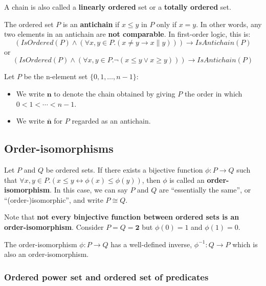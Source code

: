 \documentclass[12pt, letterpaper, oneside]{book}
\begin{document}
A chain is also called a \textbf{linearly ordered} set or a \textbf{totally ordered} set.

The ordered set $P$ is an \textbf{antichain} if $x \leqslant y$ in $P$ only if $x = y$. In other words, any two elements
in an antichain are \textbf{not comparable}. In first-order logic, this is:
\[ (IsOrdered(P) \land (\forall x, y \in P. (x \ne y \rightarrow x \parallel y))) \rightarrow IsAntichain(P) \]
or
\[ (IsOrdered(P) \land (\forall x, y \in P. \lnot(x \leqslant y \lor x \geqslant y))) \rightarrow IsAntichain(P) \]

Let $P$ be the n-element set $\{0, 1, \ldots, n-1\}$:
\begin{itemize}
  \item We write $\mathbf{n}$ to denote the chain obtained by giving $P$ the order in which $0 < 1 < \cdots < n - 1$.
  \item We write $\mathbf{\bar{n}}$ for $P$ regarded as an antichain.
\end{itemize}

\subsection{Order-isomorphisms}

Let $P$ and $Q$ be ordered sets. If there exists a bijective function $\phi: P \rightarrow Q$ such that
$\forall x, y \in P. (x \leqslant y \leftrightarrow \phi(x) \leqslant \phi(y))$, then $\phi$ is called an \textbf{order-
  isomorphism}. In this case, we can say $P$ and $Q$ are ``essentially the same'', or ``(order-)isomorphic'', and write
$P \cong Q$.

Note that \textbf{not every binjective function between ordered sets is an order-isomorphism}. Consider $P = Q = \mathbf{2}$
but $\phi(0) = 1$ and $\phi(1) = 0$.

The order-isomorphism $\phi: P \rightarrow Q$ has a well-defined inverse, $\phi^{-1}: Q \rightarrow P$ which is also an
order-isomorphism.

\subsubsection{Ordered power set and ordered set of predicates}
\end{document}
